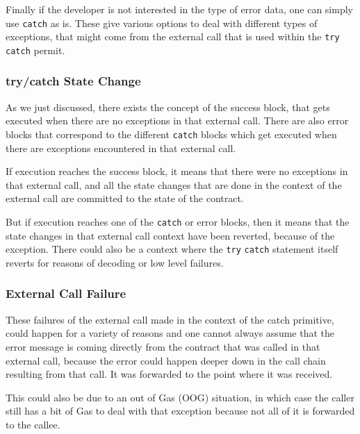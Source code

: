 Finally if the developer is not interested in the type of error data,
one can simply use \texttt{catch} as is. These give various options to
deal with different types of exceptions, that might come from the
external call that is used within the \texttt{try} \texttt{catch}
permit.

\subsubsection{try/catch State Change}\label{trycatch-state-change}

As we just discussed, there exists the concept of the success block,
that gets executed when there are no exceptions in that external call.
There are also error blocks that correspond to the different
\texttt{catch} blocks which get executed when there are exceptions
encountered in that external call.

If execution reaches the success block, it means that there were no
exceptions in that external call, and all the state changes that are
done in the context of the external call are committed to the state of
the contract.

But if execution reaches one of the \texttt{catch} or error blocks, then
it means that the state changes in that external call context have been
reverted, because of the exception. There could also be a context where
the \texttt{try} \texttt{catch} statement itself reverts for reasons of
decoding or low level failures.

\subsubsection{External Call Failure}\label{external-call-failure}

These failures of the external call made in the context of the catch
primitive, could happen for a variety of reasons and one cannot always
assume that the error message is coming directly from the contract that
was called in that external call, because the error could happen deeper
down in the call chain resulting from that call. It was forwarded to the
point where it was received.

This could also be due to an out of Gas (OOG) situation, in which case
the caller still has a bit of Gas to deal with that exception because
not all of it is forwarded to the callee.
